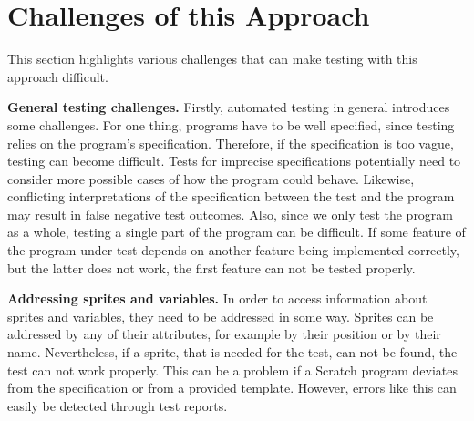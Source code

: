 \section{Challenges of this Approach}
\label{sec:appraoch_challenges}


This section highlights various challenges that can make testing with this approach difficult.
\parspace

\textbf{General testing challenges.}
Firstly, automated testing in general introduces some challenges.
For one thing, programs have to be well specified, since testing relies on the program's specification.
Therefore, if the specification is too vague, testing can become difficult.
Tests for imprecise specifications potentially need to consider more possible cases of how the program could behave.
Likewise, conflicting interpretations of the specification between the test and the program may result in false negative test outcomes.
Also, since we only test the program as a whole, testing a single part of the program can be difficult.
If some feature of the program under test depends on another feature being implemented correctly,
but the latter does not work, the first feature can not be tested properly.
\parspace

\textbf{Addressing sprites and variables.}
In order to access information about sprites and variables, they need to be addressed in some way.
Sprites can be addressed by any of their attributes, for example by their position or by their name.
Nevertheless, if a sprite, that is needed for the test, can not be found, the test can not work properly.
This can be a problem if a Scratch program deviates from the specification or from a provided template.
However, errors like this can easily be detected through test reports.
\parspace

